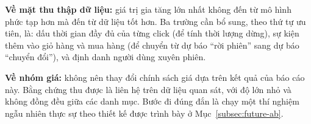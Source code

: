 \textbf{Về mặt thu thập dữ liệu:} giá trị gia tăng lớn nhất không đến từ mô hình
phức tạp hơn mà đến từ dữ liệu tốt hơn. Ba trường cần bổ sung, theo thứ tự ưu
tiên, là: dấu thời gian đầy đủ của từng click (để tính thời lượng dừng), sự kiện
thêm vào giỏ hàng và mua hàng (để chuyển từ dự báo ``rời phiên'' sang dự báo
``chuyển đổi''), và định danh người dùng xuyên phiên.

\textbf{Về nhóm giá:} không nên thay đổi chính sách giá dựa trên kết quả của báo
cáo này. Bằng chứng thu được là liên hệ trên dữ liệu quan sát, với độ lớn nhỏ và
không đồng đều giữa các danh mục. Bước đi đúng đắn là chạy một thí nghiệm ngẫu
nhiên thực sự theo thiết kế được trình bày ở Mục~\ref{subsec:future-ab}.
